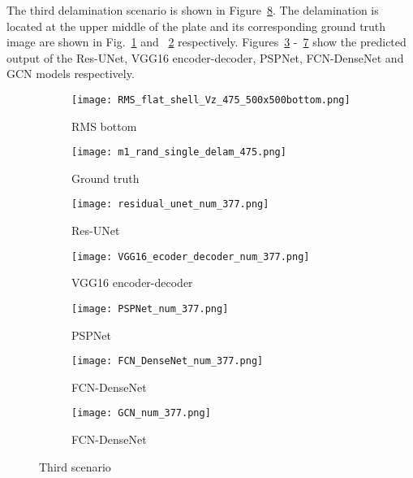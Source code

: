 The third delamination scenario is shown in Figure~\ref{fig:475_softmax}. 
The delamination is located at the upper middle of the plate and its corresponding ground truth image are shown in Fig.~\ref{fig:RMS_flat_shell_Vz_475} and ~\ref{fig:m1_rand_single_delam_475} respectively. 
Figures~\ref{fig:Unet_Pred__softmax_475} -~\ref{fig:gcn_pred_475} show the predicted output of the Res-UNet, VGG16 encoder-decoder, PSPNet, FCN-DenseNet and GCN models respectively. 
\begin{figure}[!h]
	\centering
	\begin{subfigure}[b]{0.47\textwidth}
		\centering
		\texttt{[image: RMS\_flat\_shell\_Vz\_475\_500x500bottom.png]}
		\caption{RMS bottom}
		\label{fig:RMS_flat_shell_Vz_475}
	\end{subfigure}
	\hfill
	\begin{subfigure}[b]{0.47\textwidth}
		\centering
		\texttt{[image: m1\_rand\_single\_delam\_475.png]}
		\caption{Ground truth}
		\label{fig:m1_rand_single_delam_475}
	\end{subfigure}
	\begin{subfigure}[b]{0.47\textwidth}
		\centering
		\texttt{[image: residual\_unet\_num\_377.png]}
		\caption{Res-UNet}
		\label{fig:Unet_Pred__softmax_475}
	\end{subfigure}
	\hfill
	\begin{subfigure}[b]{0.47\textwidth}
		\centering
		\texttt{[image: VGG16\_ecoder\_decoder\_num\_377.png]}
		\caption{VGG16 encoder-decoder}			\label{fig:vgg16_pred__softmax_475}			
	\end{subfigure}
	\hfill
	\begin{subfigure}[b]{0.47\textwidth}
		\centering
		\texttt{[image: PSPNet\_num\_377.png]}
		\caption{PSPNet}
		\label{fig:pspnet_pred__softmax_475}
	\end{subfigure}	
	\hfill
	\begin{subfigure}[b]{0.47\textwidth}
		\centering
		\texttt{[image: FCN\_DenseNet\_num\_377.png]}
		\caption{FCN-DenseNet}
		\label{fig:fcn_densenet_pred__softmax_475}
	\end{subfigure}
	\hfill
	\begin{subfigure}[b]{0.47\textwidth}
		\centering
		\texttt{[image: GCN\_num\_377.png]}
		\caption{FCN-DenseNet}
		\label{fig:gcn_pred_475}
	\end{subfigure}	
	\caption{Third scenario}
	\label{fig:475_softmax}
\end{figure}
